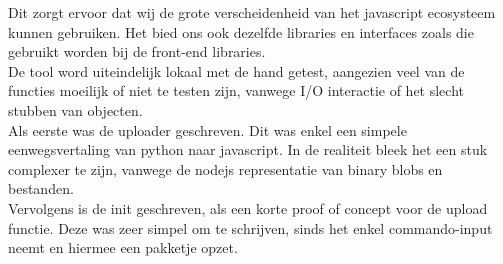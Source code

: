 Dit zorgt ervoor dat wij de grote verscheidenheid van het javascript ecosysteem kunnen gebruiken. Het bied ons ook dezelfde libraries en interfaces zoals die gebruikt worden bij de front-end libraries. \\ 

De tool word uiteindelijk lokaal met de hand getest, aangezien veel van de functies moeilijk of niet te testen zijn, vanwege I/O interactie of het slecht stubben van objecten. \\

Als eerste was de uploader geschreven. Dit was enkel een simpele eenwegsvertaling van python naar javascript. In de realiteit bleek het een stuk complexer te zijn, vanwege de nodejs representatie van binary blobs en bestanden. \\ 

Vervolgens is de init geschreven, als een korte proof of concept voor de upload functie. Deze was zeer simpel om te schrijven, sinds het enkel commando-input neemt en hiermee een pakketje opzet. \\

